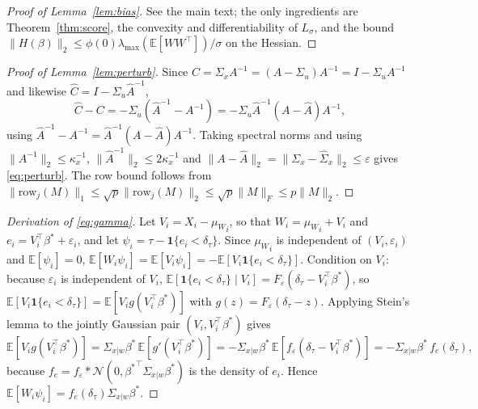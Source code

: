 \documentclass[12pt,a4paper]{article}
\theoremstyle{definition}
\theoremstyle{remark}
\newcommand{\E}{\mathbb{E}}
\newcommand{\cN}{\mathcal{N}}
\newcommand{\ind}[1]{\mathbf{1}\{#1\}}
\newcommand{\norm}[1]{\|#1\|}
\newcommand{\betas}{\beta^*}
\newcommand{\muv}{\mu_W}
\newcommand{\Sxw}{\Sigma_{x|w}}
\newcommand{\Ccal}{C}
\begin{document}
\begin{proof}[Proof of Lemma~\ref{lem:bias}]
See the main text; the only ingredients are Theorem~\ref{thm:score}, the convexity and
differentiability of $L_\sigma$, and the bound
$\norm{H(\beta)}_2\le\phi(0)\lambda_{\max}(\E[WW^\top])/\sigma$ on the Hessian.
\end{proof}

\begin{proof}[Proof of Lemma~\ref{lem:perturb}]
Since $\Ccal=\Sigma_xA^{-1}=(A-\Sigma_u)A^{-1}=I-\Sigma_uA^{-1}$ and likewise
$\hat\Ccal=I-\Sigma_u\hat A^{-1}$,
\[
\hat\Ccal-\Ccal=-\Sigma_u(\hat A^{-1}-A^{-1})=-\Sigma_u\hat A^{-1}(A-\hat A)A^{-1},
\]
using $\hat A^{-1}-A^{-1}=\hat A^{-1}(A-\hat A)A^{-1}$. Taking spectral norms and using
$\|A^{-1}\|_2\le\kappa_x^{-1}$, $\|\hat A^{-1}\|_2\le2\kappa_x^{-1}$ and
$\|A-\hat A\|_2=\|\Sigma_x-\hat\Sigma_x\|_2\le\varepsilon$ gives \eqref{eq:perturb}. The
row bound follows from
$\|\mathrm{row}_j(M)\|_1\le\sqrt p\|\mathrm{row}_j(M)\|_2\le\sqrt p\|M\|_F\le p\|M\|_2$.
\end{proof}

\begin{proof}[Derivation of \eqref{eq:gamma}]
Let $V_i=X_i-{\muv}_i$, so that $W_i={\muv}_i+V_i$ and $e_i=V_i^\top\betas+\varepsilon_i$,
and let $\psi_i=\tau-\ind{e_i<\delta_\tau}$. Since ${\muv}_i$ is independent of
$(V_i,\varepsilon_i)$ and $\E[\psi_i]=0$,
$\E[W_i\psi_i]=\E[V_i\psi_i]=-\E[V_i\ind{e_i<\delta_\tau}]$. Condition on $V_i$: because
$\varepsilon_i$ is independent of $V_i$,
$\E[\ind{e_i<\delta_\tau}\mid V_i]=F_\varepsilon(\delta_\tau-V_i^\top\betas)$, so
$\E[V_i\ind{e_i<\delta_\tau}]=\E[V_ig(V_i^\top\betas)]$ with
$g(z)=F_\varepsilon(\delta_\tau-z)$. Applying Stein's lemma to the jointly Gaussian pair
$(V_i,V_i^\top\betas)$ gives
\[
\E[V_ig(V_i^\top\betas)]=\Sxw\betas\,\E[g'(V_i^\top\betas)]
=-\Sxw\betas\,\E[f_\varepsilon(\delta_\tau-V_i^\top\betas)]
=-\Sxw\betas\,f_e(\delta_\tau),
\]
because $f_e=f_\varepsilon*\cN(0,{\betas}^\top\Sxw\betas)$ is the density of $e_i$. Hence
$\E[W_i\psi_i]=f_e(\delta_\tau)\Sxw\betas$.
\end{proof}
\end{document}
